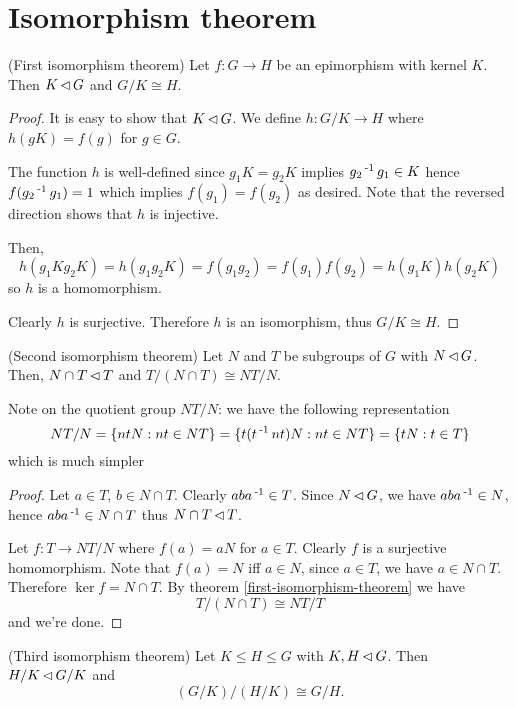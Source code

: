 \documentclass[12pt]{article}
\begin{document}
\newpage
\section{Isomorphism theorem}
	\begin{theorem}\label{first-isomorphism-theorem}
		(First isomorphism theorem) Let $f: G\to H$ be an epimorphism with kernel $K$. Then $K \operatorname{\vartriangleleft} G$ and $G/K \cong H$.
	\end{theorem}
	\begin{proof}
		It is easy to show that $K \operatorname{\vartriangleleft} G$. We define $h: G/K \to H$ where $h(gK) = f(g)$ for $g\in G$. 

		The function $h$ is well-defined since $g_1 K = g_2 K$ implies $g_2\operatorname{^{-1}} g_1 \in K$ hence $f(g_2\operatorname{^{-1}} g_1) = 1$ which implies $f(g_1)=f(g_2)$ as desired. Note that the reversed direction shows that $h$ is injective.

		Then, 
		$$h(g_1Kg_2K) = h(g_1g_2K) = f(g_1g_2) = f(g_1)f(g_2) = h(g_1K)h(g_2K)$$
		so $h$ is a homomorphism.

		Clearly $h$ is surjective. Therefore $h$ is an isomorphism, thus $G/K \cong H$.
	\end{proof}

	\begin{theorem}\label{second-isomorphism-theorem}
		(Second isomorphism theorem) Let $N$ and $T$ be subgroups of $G$ with $N \operatorname{\vartriangleleft} G$. Then, $N\cap T \operatorname{\vartriangleleft} T$ and $T/(N \cap T) \cong NT/N$.
	\end{theorem}

	Note on the quotient group $NT/N$: we have the following representation
	$$NT/N = \{ntN : nt\in NT\} = \{t(t\operatorname{^{-1}} nt)N : nt\in NT\} = \{tN : t\in T\}$$
	which is much simpler

	\begin{proof}
		Let $a\in T$, $b\in N\cap T$. Clearly $aba\operatorname{^{-1}} \in T$. Since $N\operatorname{\vartriangleleft} G$, we have $aba\operatorname{^{-1}} \in N$, hence $aba\operatorname{^{-1}} \in N\cap T$ thus $N\cap T \operatorname{\vartriangleleft} T$.

		Let $f: T \to NT/N$ where $f(a) = aN$ for $a\in T$. Clearly $f$ is a surjective homomorphism. Note that $f(a) = N$ iff $a\in N$, since $a\in T$, we have $a\in N\cap T$. Therefore $\ker f = N\cap T$. By theorem \ref{first-isomorphism-theorem} we have
		$$T/(N\cap T) \cong NT/T$$
		and we're done. 
	\end{proof}

	\begin{theorem}\label{third-isomorphism-theorem}
		(Third isomorphism theorem) Let $K\leq H\leq G$ with $K,H\operatorname{\vartriangleleft} G$. Then $H/K \operatorname{\vartriangleleft} G/K$ and 
		$$(G/K)/(H/K) \cong G/H.$$
	\end{theorem}
\end{document}
